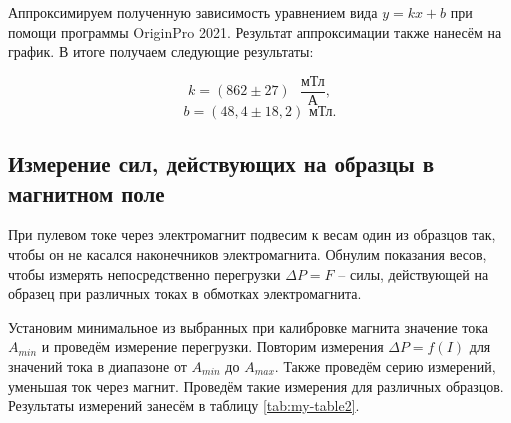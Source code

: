 \documentclass[a4paper,12pt]{article} %
\begin{document}
Аппроксимируем полученную зависимость уравнением вида $ y=kx+b $ при помощи программы OriginPro 2021. Результат аппроксимации также нанесём на график. В итоге получаем следующие результаты: 

\[ k = (862 \pm 27) \text{ } \frac{\text{мТл}}{\text{А}}, \]
\[ b = (48,4 \pm 18,2) \text{ мТл}. \]

\subsection{Измерение сил, действующих на образцы в магнитном поле}

При пулевом токе через электромагнит подвесим к весам один из образцов так, чтобы он не касался наконечников электромагнита. Обнулим показания весов, чтобы измерять непосредственно перегрузки $ \Delta P = F $ -- силы, действующей на образец при различных токах в обмотках электромагнита.


Установим минимальное из выбранных при калибровке магнита значение тока $ A_{min} $ и проведём измерение перегрузки. Повторим измерения $ \Delta P = f(I) $ для значений тока в диапазоне от $ A_{min} $ до $ A_{max} $. Также проведём серию измерений, уменьшая ток через магнит. Проведём такие измерения для различных образцов. Результаты измерений занесём в таблицу \ref{tab:my-table2}.
\end{document}
